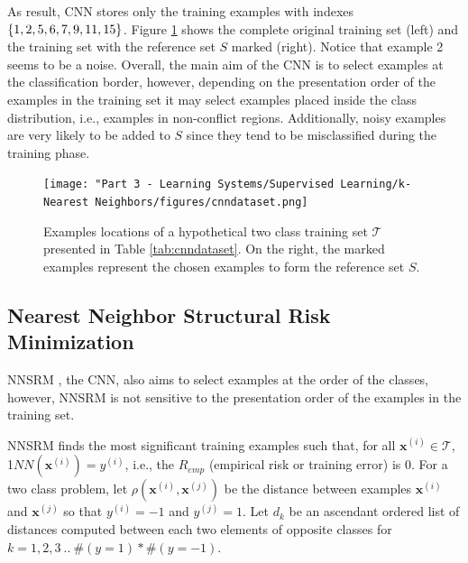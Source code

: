 \vspace{0.4cm}

As result, CNN stores only the training examples with indexes $\{1,2,5,\\6,7,9,11,15\}$. Figure \ref{fig:cnndataset} shows the complete original training set (left) and the training set with the reference set $S$ marked (right). Notice that example 2 seems to be a noise. Overall, the main aim of the CNN is to select examples at the classification border, however, depending on the presentation order of the examples in the training set it may select examples placed inside the class distribution, i.e., examples in non-conflict regions. Additionally, noisy examples are very likely to be added to $S$ since they tend to be misclassified during the training phase.%

\begin{figure}[h]
    \centering
    \texttt{[image: "Part 3 - Learning Systems/Supervised Learning/k-Nearest Neighbors/figures/cnndataset.png]}
    \caption{Examples locations of a hypothetical two class training set $\mathcal{T}$ presented in Table \ref{tab:cnndataset}. On the right, the marked examples represent the chosen examples to form the reference set $S$.}
    \label{fig:cnndataset}
\end{figure}

\subsection{Nearest Neighbor Structural Risk Minimization}

NNSRM \cite{nnsrm:2003}, the CNN, also aims to select examples at the order of the classes, however, NNSRM is not sensitive to the presentation order of the examples in the training set. 

NNSRM finds the most significant training examples such that, for all $\mathbf{x}^{(i)} \in \mathcal{T}$, 1$NN(\mathbf{x}^{(i)}) = y^{(i)}$, i.e., the $R_{emp}$ (empirical risk or training error) is 0. For a two class problem, let $\rho(\mathbf{x}^{(i)},\mathbf{x}^{(j)})$ be the distance between examples $\mathbf{x}^{(i)}$ and $\mathbf{x}^{(j)}$ so that $y^{(i)} = -1$ and $y^{(j)} = 1$. Let $d_k$ be an ascendant ordered list of distances computed between each two elements of opposite classes for $k = 1, 2, 3 \: .. \: \#(y=1) * \#(y=-1)$.

